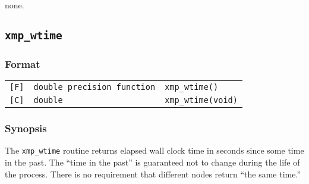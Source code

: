 none.

%
%
%
%
%
%
%
%
%

\subsection{\tt xmp\_wtime}

\subsubsection*{Format}

\begin{tabular}{lll}

\verb![F]!&  {\tt double precision function}& {\tt xmp\_wtime()}\\

\verb![C]!&  {\tt double}& {\tt xmp\_wtime(void)}

\end{tabular}

\subsubsection*{Synopsis}
    The {\tt xmp\_wtime} routine returns elapsed wall clock time in seconds 
    since some time in the past. The ``time in the past'' is guaranteed
    not to change during the life of the process.
    There is no requirement that different nodes return ``the same time.''

